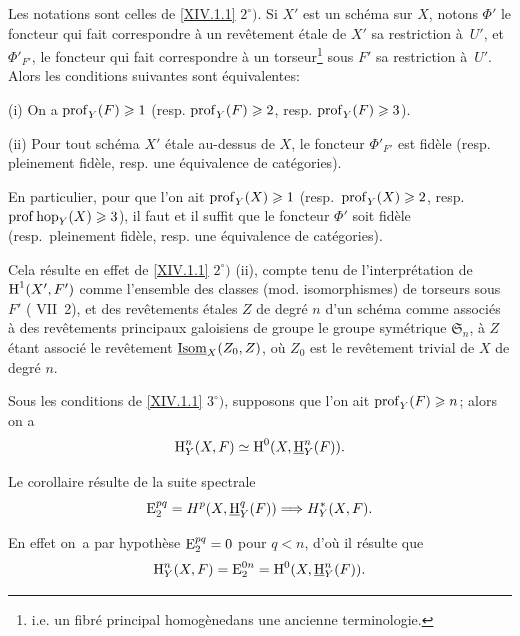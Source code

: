 \begin{corollaire} \label{XIV.1.4} Les notations sont celles de \ref{XIV.1.1} $2^\circ)$. Si $X'$ est un sch\'ema sur $X$, notons $\Phi'$ le foncteur qui fait correspondre \`a un rev\^etement \'etale de $X'$ sa restriction \`a~$U'$, et $\Phi'_{F'}$, le foncteur qui fait correspondre \`a un torseur\footnote{i.e. un \og fibr\'e principal homog\`ene\fg dans une ancienne terminologie.} sous $F'$ sa restriction \`a~$U'$. Alors les conditions suivantes sont \'equivalentes:

\textup{(i)} On a $\operatorname{prof}_Y(F)\geqslant 1$ (resp. $\operatorname{prof}_Y(F)\geqslant 2$, resp. $\operatorname{prof}_Y(F)\geqslant 3$).

\textup{(ii)} Pour tout sch\'ema $X'$ \'etale au-dessus de $X$, le foncteur $\Phi'_{F'}$ est fid\`ele (resp. pleinement fid\`ele, resp. une \'equivalence de cat\'egories).

En particulier, pour que l'on ait $\operatorname{prof}_Y({X})\geqslant 1$ (resp.\ $\operatorname{prof}_Y({X})\geqslant 2$, resp.\ $\operatorname{prof} \operatorname{hop}_Y(X)\geqslant 3$), il faut et il suffit que le foncteur $\Phi'$ soit fid\`ele (resp.\ pleinement fid\`ele, resp. une \'equivalence de cat\'egories).
\end{corollaire}

Cela r\'esulte en effet de \ref{XIV.1.1} $2^\circ)$ \textup{(ii)}, compte tenu de l'interpr\'etation de $\operatorname{H}^1(X', F')$ comme l'ensemble des classes (mod. isomorphismes) de torseurs sous $F'$ ( VII~2), et des rev\^etements \'etales $Z$ de degr\'e $n$ d'un sch\'ema comme associ\'es \`a des rev\^etements principaux galoisiens de groupe le groupe sym\'etrique $\mathfrak{S}_n$, \`a $Z$ \'etant associ\'e le rev\^etement $\underline{\textup{Isom}}_X(Z_0, Z)$, o\`u $Z_0$ est le rev\^etement trivial de $X$ de degr\'e $n$.

\begin{corollaire} \label{XIV.1.5} Sous les conditions de \ref{XIV.1.1} $3^\circ)$, supposons que l'on ait $\operatorname{prof}_Y(F)\geqslant n$; alors on a
$$
\operatorname{H}_Y^n(X, F)\simeq \operatorname{H}^0(X, {\mathop{\underline{\mathrm{H}}}\nolimits}_Y^n(F)).
$$
\end{corollaire}

Le corollaire r\'esulte de la suite spectrale
$$
\E_2^{pq}=H^p(X, {\mathop{\underline{\mathrm{H}}}\nolimits}_Y^q(F))\To H_Y^*(X, F).
$$

En effet on~a par hypoth\`ese $\operatorname{E}_2^{pq}=0$ pour $q<n$, d'o\`u il r\'esulte que
$$
\operatorname{H}_Y^n(X, F)=\operatorname{E}_2^{0n}=\operatorname{H}^0(X, {\mathop{\underline{\mathrm{H}}}\nolimits}_Y^n(F)).
$$

